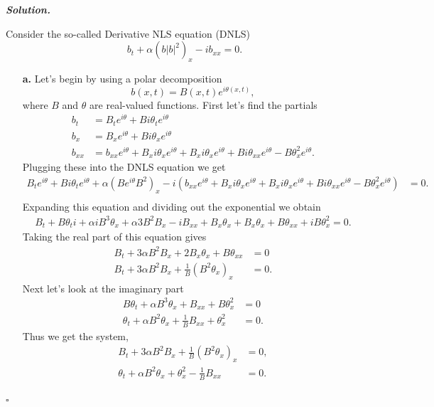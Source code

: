 \documentclass[12pt]{report}
\newenvironment{solution}[1][\it{Solution}]{\textbf{#1. } }{$\square$}
\newcommand{\paren}[1]{{\left(#1\right)}} %
\begin{document}
\begin{solution}
   
    \noindent
    Consider the so-called Derivative NLS equation (DNLS)
    \[
    b_t+\alpha \left(b |b|^2\right)_x-i b_{xx}=0.
    \]
    
    \begin{enumerate}
        \item[{\bf a.}]
        Let's begin by using a polar decomposition
        \[
            b(x,t) = B(x,t)e^{i\theta(x,t)},
        \]
        where $B$ and $\theta$ are real-valued functions. First let's find the partials
        \begin{align*}
            b_t &= B_te^{i\theta} + Bi\theta_te^{i\theta}\\
            b_x &= B_xe^{i\theta} + Bi\theta_xe^{i\theta}\\
            b_{xx} &= b_{xx}e^{i\theta} + B_x i \theta_x e^{i\theta} + B_xi\theta_xe^{i\theta} + Bi\theta_{xx}e^{i\theta} - B\theta_x^2e^{i\theta}.
        \end{align*}
        Plugging these into the DNLS equation we get
        \begin{align*}
            B_te^{i\theta} + Bi\theta_te^{i\theta} + \alpha(Be^{i\theta}B^2)_x - i\paren{b_{xx}e^{i\theta} + B_x i \theta_x e^{i\theta} + B_xi\theta_xe^{i\theta} + Bi\theta_{xx}e^{i\theta} - B\theta_x^2e^{i\theta}} &= 0.\\
        \end{align*}
        Expanding this equation and dividing out the exponential we obtain
        \begin{align*}
            B_t + B\theta_t i + \alpha i B^3\theta_x + \alpha 3 B^2B_x - iB_{xx} + B_x\theta_x + B_x\theta_x + B\theta_{xx} + iB\theta_x^2 = 0.
        \end{align*}
        Taking the real part of this equation gives
        \begin{align*}
            B_t + 3\alpha B^2 B_x + 2B_x \theta_x + B\theta_{xx} &= 0\\
            B_t + 3\alpha B^2 B_x + \frac{1}{B}(B^2\theta_x)_x &= 0.
        \end{align*}
        Next let's look at the imaginary part
        \begin{align*}
            B\theta_t + \alpha B^3 \theta_x + B_{xx} + B\theta_x^2 &= 0\\
            \theta_t + \alpha B^2 \theta_x + \frac{1}{B}B_{xx} + \theta_x^2 &= 0.
        \end{align*}
        Thus we get the system,
        \begin{align}
            B_t+3\alpha B^2 B_x+\frac{1}{B}(B^2 \theta_x)_x&=0,\\
            \theta_t+\alpha B^2 \theta_x+\theta_x^2-\frac{1}{B}B_{xx}&=0.
        \end{align}


\end{enumerate}
\end{solution}
\end{document}
